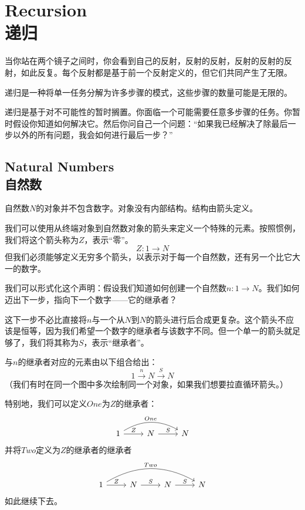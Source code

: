 \documentclass[DaoFP]{subfiles}
\begin{document}
    \setcounter{chapter}{6}

    \chapter{Recursion\\递归}

    当你站在两个镜子之间时，你会看到自己的反射，反射的反射，反射的反射的反射，如此反复。每个反射都是基于前一个反射定义的，但它们共同产生了无限。

    递归是一种将单一任务分解为许多步骤的模式，这些步骤的数量可能是无限的。

    递归是基于对不可能性的暂时搁置。你面临一个可能需要任意多步骤的任务。你暂时假设你知道如何解决它。然后你问自己一个问题：“如果我已经解决了除最后一步以外的所有问题，我会如何进行最后一步？”

    \section{Natural Numbers\\自然数}

    自然数$N$的对象并不包含数字。对象没有内部结构。结构由箭头定义。

    我们可以使用从终端对象到自然数对象的箭头来定义一个特殊的元素。按照惯例，我们将这个箭头称为$Z$，表示“零”。
    \[ Z \colon 1 \to N \]
    但我们必须能够定义无穷多个箭头，以表示对于每一个自然数，还有另一个比它大一的数字。

    我们可以形式化这个声明：假设我们知道如何创建一个自然数$n \colon 1 \to N$。我们如何迈出下一步，指向下一个数字——它的继承者？

    这下一步不必比直接将$n$与一个从$N$到$N$的箭头进行后合成更复杂。这个箭头不应该是恒等，因为我们希望一个数字的继承者与该数字不同。但一个单一的箭头就足够了，我们将其称为$S$，表示“继承者”。

    与$n$的继承者对应的元素由以下组合给出：
    \[ 1 \xrightarrow{n} N \xrightarrow{S} N\]
    （我们有时在同一个图中多次绘制同一个对象，如果我们想要拉直循环箭头。）

    特别地，我们可以定义$One$为$Z$的继承者：
    \[
        \begin{tikzcd}
            1
            \arrow[rr, bend left, "One"]
            \arrow[r, "Z"]
            &N
            \arrow[r, "S"]
            &N
        \end{tikzcd}
    \]
    并将$Two$定义为$Z$的继承者的继承者
    \[
        \begin{tikzcd}
            1
            \arrow[rrr, bend left, "Two"]
            \arrow[r, "Z"]
            &N
            \arrow[r, "S"]
            &N
            \arrow[r, "S"]
            &N
        \end{tikzcd}
    \]
    如此继续下去。
\end{document}
